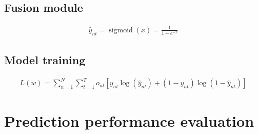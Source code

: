 \subsection{Fusion module}

\begin{align}
  \hat{y}_{nt}=\operatorname{sigmoid}(x)=\frac{1}{1+e^{-x}}
\end{align}


\subsection{Model training}

\begin{align}
  L(w)=\sum_{n=1}^N \sum_{t=1}^T o_{nt}\left[y_{nt} \log(\hat{y}_{nt}) + (1-y_{nt}) \log(1-\hat{y}_{nt})\right]
\end{align}


\section{Prediction performance evaluation}
